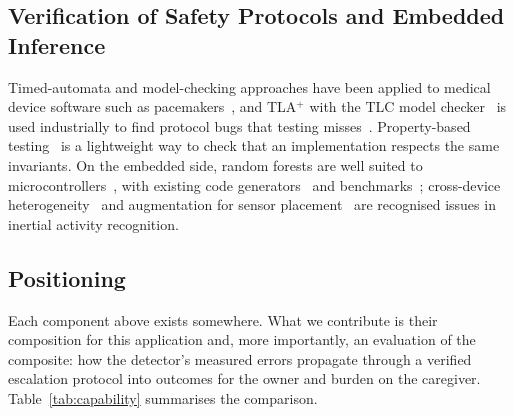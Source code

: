 \subsection{Verification of Safety Protocols and Embedded Inference}
Timed-automata and model-checking approaches have been applied to medical device software such as pacemakers~\cite{jee2010pacemaker,jiang2012pacemaker}, and TLA$^+$ with the TLC model checker~\cite{lamport2002specifying,yu1999tlc} is used industrially to find protocol bugs that testing misses~\cite{newcombe2015aws}. Property-based testing~\cite{claessen2000quickcheck,maciver2019hypothesis} is a lightweight way to check that an implementation respects the same invariants. On the embedded side, random forests are well suited to microcontrollers~\cite{elsts2021mcu,tabanelli2022rf,daghero2021adaptive,sancheziborra2020tinyml}, with existing code generators~\cite{nordby2019emlearn,micromlgen} and benchmarks~\cite{banbury2021mlperftiny}; cross-device heterogeneity~\cite{stisen2015smart} and augmentation for sensor placement~\cite{um2017augmentation} are recognised issues in inertial activity recognition.

\subsection{Positioning}
Each component above exists somewhere. What we contribute is their composition for this application and, more importantly, an evaluation of the composite: how the detector's measured errors propagate through a verified escalation protocol into outcomes for the owner and burden on the caregiver. Table~\ref{tab:capability} summarises the comparison.

